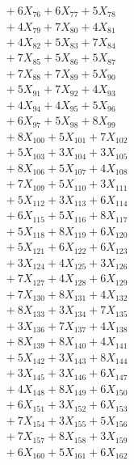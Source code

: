 \documentclass[a4paper,10pt]{article}
\begin{document}
{\begin{align}
&\;  + 6 X_{76} + 6 X_{77} + 5 X_{78} \\[0.3ex]
&\;  + 4 X_{79} + 7 X_{80} + 4 X_{81} \\[0.3ex]
&\;  + 4 X_{82} + 5 X_{83} + 7 X_{84} \\[0.3ex]
&\;  + 7 X_{85} + 5 X_{86} + 5 X_{87} \\[0.3ex]
&\;  + 7 X_{88} + 7 X_{89} + 5 X_{90} \\[0.3ex]
&\;  + 5 X_{91} + 7 X_{92} + 4 X_{93} \\[0.3ex]
&\;  + 4 X_{94} + 4 X_{95} + 5 X_{96} \\[0.3ex]
&\;  + 6 X_{97} + 5 X_{98} + 8 X_{99} \\[0.5ex]\allowbreak
&\;  + 8 X_{100} + 5 X_{101} + 7 X_{102} \\[0.3ex]
&\;  + 5 X_{103} + 3 X_{104} + 3 X_{105} \\[0.3ex]
&\;  + 8 X_{106} + 5 X_{107} + 4 X_{108} \\[0.3ex]
&\;  + 7 X_{109} + 5 X_{110} + 3 X_{111} \\[0.3ex]
&\;  + 5 X_{112} + 3 X_{113} + 6 X_{114} \\[0.3ex]
&\;  + 6 X_{115} + 5 X_{116} + 8 X_{117} \\[0.3ex]
&\;  + 5 X_{118} + 8 X_{119} + 6 X_{120} \\[0.3ex]
&\;  + 5 X_{121} + 6 X_{122} + 6 X_{123} \\[0.3ex]
&\;  + 3 X_{124} + 4 X_{125} + 3 X_{126} \\[0.3ex]
&\;  + 7 X_{127} + 4 X_{128} + 6 X_{129} \\[0.5ex]\allowbreak
&\;  + 7 X_{130} + 8 X_{131} + 4 X_{132} \\[0.3ex]
&\;  + 8 X_{133} + 3 X_{134} + 7 X_{135} \\[0.3ex]
&\;  + 3 X_{136} + 7 X_{137} + 4 X_{138} \\[0.3ex]
&\;  + 8 X_{139} + 8 X_{140} + 4 X_{141} \\[0.3ex]
&\;  + 5 X_{142} + 3 X_{143} + 8 X_{144} \\[0.3ex]
&\;  + 3 X_{145} + 3 X_{146} + 6 X_{147} \\[0.3ex]
&\;  + 4 X_{148} + 8 X_{149} + 6 X_{150} \\[0.3ex]
&\;  + 6 X_{151} + 3 X_{152} + 6 X_{153} \\[0.3ex]
&\;  + 7 X_{154} + 3 X_{155} + 5 X_{156} \\[0.3ex]
&\;  + 7 X_{157} + 8 X_{158} + 3 X_{159} \\[0.5ex]\allowbreak
&\;  + 6 X_{160} + 5 X_{161} + 6 X_{162} \\[0.3ex]

\end{align}}
\end{document}
